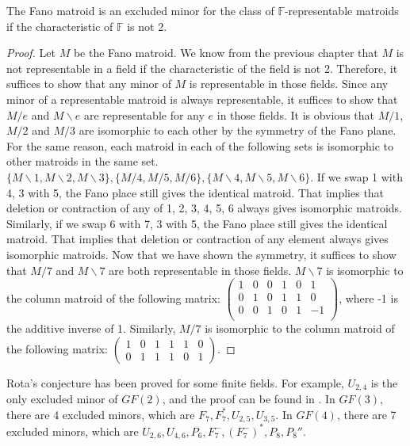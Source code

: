 \begin{thm}
The Fano matroid is an excluded minor for the class of $\mathbb{F}$-representable matroids if the characteristic of $\mathbb{F}$ is not 2.
\end{thm}
\begin{proof}
Let $M$ be the Fano matroid.
We know from the previous chapter that $M$ is not representable in a field if the characteristic of the field is not 2.
Therefore, it suffices to show that any minor of $M$ is representable in those fields.
Since any minor of a representable matroid is always representable, it suffices to show that $M / e$ and $M \backslash e$ are representable for any $e$ in those fields.
It is obvious that $M / 1$, $M / 2$ and $M / 3$ are isomorphic to each other by the symmetry of the Fano plane.
For the same reason, each matroid in each of the following sets is isomorphic to other matroids in the same set.
$\{ M \backslash 1, M \backslash 2, M \backslash 3 \}, \{ M / 4, M / 5, M / 6 \}, \{ M \backslash 4, M \backslash 5, M \backslash 6 \}$.
If we swap 1 with 4, 3 with 5, the Fano place still gives the identical matroid.
That implies that deletion or contraction of any of 1, 2, 3, 4, 5, 6 always gives isomorphic matroids.
Similarly, if we swap 6 with 7, 3 with 5, the Fano place still gives the identical matroid.
That implies that deletion or contraction of any element always gives isomorphic matroids.
Now that we have shown the symmetry, it suffices to show that $M / 7$ and $M \backslash  7$ are both representable in those fields.
$M \backslash 7$ is isomorphic to the column matroid of the following matrix:
$\begin{pmatrix}
1 & 0 & 0 & 1 & 0 & 1 \\
0 & 1 & 0 & 1 & 1 & 0 \\
0 & 0 & 1 & 0 & 1 & -1 \\
\end{pmatrix}$, where -1 is the additive inverse of 1.
Similarly, $M / 7$ is isomorphic to the column matroid of the following matrix:
$\begin{pmatrix}
1 & 0 & 1 & 1 & 1 & 0 \\
0 & 1 & 1 & 1 & 0 & 1
\end{pmatrix}$.
\end{proof}

Rota's conjecture has been proved for some finite fields.
For example, $U_{2, 4}$ is the only excluded minor of $GF(2)$, and the proof can be found in \cite{lec9}.
In $GF(3)$, there are 4 excluded minors, which are $F_7, F_7^\ast, U_{2, 5}, U_{3, 5}$.\cite{lec9}
In $GF(4)$, there are 7 excluded minors, which are $U_{2, 6}, U_{4, 6}, P_6, F_7^-, (F_7^-)^\ast, P_8, P_8''$.\cite{gf4}

